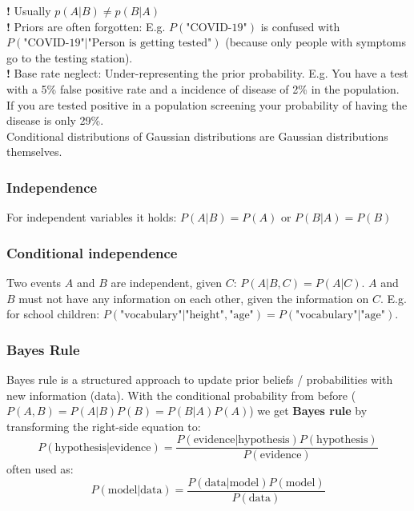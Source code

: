 \documentclass[
]{book}
\begin{document}
\textbf{!} Usually \(p(A|B) \neq p(B|A)\)\\
\textbf{!} Priors are often forgotten: E.g. \(P(\text{"COVID-19"})\) is
confused with \(P(\text{"COVID-19"}|\text{"Person is getting tested"})\)
(because only people with symptoms go to the testing station).\\
\textbf{!} Base rate neglect: Under-representing the prior probability. E.g.
You have a test with a 5\% false positive rate and a incidence of disease
of 2\% in the population. If you are tested positive in a population
screening your probability of having the disease is only 29\%.\\
Conditional distributions of Gaussian distributions are Gaussian
distributions themselves.

\hypertarget{independence}{%
\subsubsection{Independence}\label{independence}}

For independent variables it holds: \(P(A|B)=P(A)\) or \(P(B|A)=P(B)\)

\hypertarget{conditional-independence}{%
\subsubsection{Conditional independence}\label{conditional-independence}}

Two events \(A\) and \(B\) are independent, given \(C\): \(P(A|B,C)=P(A|C)\).
\(A\) and \(B\) must not have any information on each other, given the
information on \(C\). E.g. for school children:
\(P(\text{"vocabulary"}|\text{"height"}, \text{"age"})= P(\text{"vocabulary"}|\text{"age"})\).

\hypertarget{bayes-rule}{%
\subsubsection{Bayes Rule}\label{bayes-rule}}

Bayes rule is a structured approach to update prior beliefs /
probabilities with new information (data). With the conditional
probability from before (\(P(A,B)=P(A|B)P(B)=P(B|A)P(A)\)) we get \textbf{Bayes
rule} by transforming the right-side equation
to:\[P(\text{hypothesis}|\text{evidence}) =\dfrac{P(\text{evidence}|\text{hypothesis})P(\text{hypothesis})}{P(\text{evidence})}\]
often used as:
\[P(\text{model}|\text{data}) =\dfrac{P(\text{data}|\text{model})P(\text{model})}{P(\text{data})}\]
\end{document}
